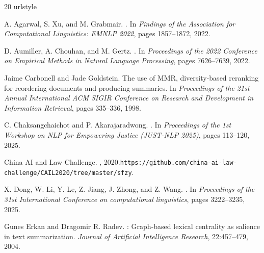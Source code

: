 \documentclass[10pt,twocolumn,letterpaper]{article}
\begin{document}
{\small
\begin{thebibliography}{20}
\providecommand{\natexlab}[1]{#1}
\providecommand{\url}[1]{\texttt{#1}}
\expandafter\ifx\csname urlstyle\endcsname\relax
  \providecommand{\doi}[1]{doi: #1}\else
  \providecommand{\doi}{doi: \begingroup \urlstyle{rm}\Url}\fi

A. Agarwal, S. Xu, and M. Grabmair.
.
\newblock In \emph{Findings of the Association for Computational Linguistics:
  EMNLP 2022}, pages 1857--1872, 2022.

D. Aumiller, A. Chouhan, and M. Gertz.
.
\newblock In \emph{Proceedings of the 2022 Conference on Empirical Methods in
  Natural Language Processing}, pages 7626--7639, 2022.

Jaime Carbonell and Jade Goldstein.
\newblock The use of {MMR}, diversity-based reranking for reordering documents and producing summaries.
\newblock In \emph{Proceedings of the 21st Annual International ACM SIGIR Conference on Research and Development in Information Retrieval}, pages 335--336, 1998.

C. Chaksangchaichot and P. Akarajaradwong.
.
\newblock In \emph{Proceedings of the 1st Workshop on NLP for Empowering
  Justice (JUST-NLP 2025)}, pages 113--120, 2025.

{{China AI and Law Challenge}}.
, 2020.\newblock \url{https://github.com/china-ai-law-challenge/CAIL2020/tree/master/sfzy}.

X. Dong, W. Li, Y. Le, Z. Jiang, J. Zhong, and Z. Wang.
.
\newblock In \emph{Proceedings of the 31st International Conference on
  computational linguistics}, pages 3222--3235, 2025.

Gunes Erkan and Dragomir R. Radev.
: Graph-based lexical centrality as salience in text summarization.
\newblock \emph{Journal of Artificial Intelligence Research}, 22:457--479, 2004.


\end{thebibliography}}
\end{document}
